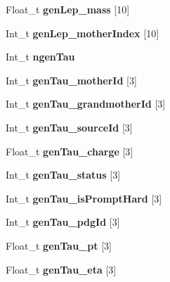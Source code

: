 \begin{DoxyCompactItemize}
Float\+\_\+t {\bfseries gen\+Lep\+\_\+mass} \mbox{[}10\mbox{]}
\item 
\hypertarget{classMiniTree_a01d35a8ecfa9de58be1a0b0c47d22b92}{}\label{classMiniTree_a01d35a8ecfa9de58be1a0b0c47d22b92} 
Int\+\_\+t {\bfseries gen\+Lep\+\_\+mother\+Index} \mbox{[}10\mbox{]}
\item 
\hypertarget{classMiniTree_ab884fe7256b0ea4e2cf3d645eb722571}{}\label{classMiniTree_ab884fe7256b0ea4e2cf3d645eb722571} 
Int\+\_\+t {\bfseries ngen\+Tau}
\item 
\hypertarget{classMiniTree_ae624f2f7687d7b5708c8483f9ba8621f}{}\label{classMiniTree_ae624f2f7687d7b5708c8483f9ba8621f} 
Int\+\_\+t {\bfseries gen\+Tau\+\_\+mother\+Id} \mbox{[}3\mbox{]}
\item 
\hypertarget{classMiniTree_af1a69b0a5745dfa62410b24331b5b0cf}{}\label{classMiniTree_af1a69b0a5745dfa62410b24331b5b0cf} 
Int\+\_\+t {\bfseries gen\+Tau\+\_\+grandmother\+Id} \mbox{[}3\mbox{]}
\item 
\hypertarget{classMiniTree_af50be52be6f2c227b98edfdd798f6ea0}{}\label{classMiniTree_af50be52be6f2c227b98edfdd798f6ea0} 
Int\+\_\+t {\bfseries gen\+Tau\+\_\+source\+Id} \mbox{[}3\mbox{]}
\item 
\hypertarget{classMiniTree_a94d917bf8c71b594802d6f8d9d6b7975}{}\label{classMiniTree_a94d917bf8c71b594802d6f8d9d6b7975} 
Float\+\_\+t {\bfseries gen\+Tau\+\_\+charge} \mbox{[}3\mbox{]}
\item 
\hypertarget{classMiniTree_a2dc647d09b8fb285c789ef62c91e6342}{}\label{classMiniTree_a2dc647d09b8fb285c789ef62c91e6342} 
Int\+\_\+t {\bfseries gen\+Tau\+\_\+status} \mbox{[}3\mbox{]}
\item 
\hypertarget{classMiniTree_aa17eaa39cd1d06c38138fe9fc2af29b3}{}\label{classMiniTree_aa17eaa39cd1d06c38138fe9fc2af29b3} 
Int\+\_\+t {\bfseries gen\+Tau\+\_\+is\+Prompt\+Hard} \mbox{[}3\mbox{]}
\item 
\hypertarget{classMiniTree_a84e0e07a91ea6692020e001594b357fe}{}\label{classMiniTree_a84e0e07a91ea6692020e001594b357fe} 
Int\+\_\+t {\bfseries gen\+Tau\+\_\+pdg\+Id} \mbox{[}3\mbox{]}
\item 
\hypertarget{classMiniTree_a4c131fda5ecd3ecb766535077b9d6472}{}\label{classMiniTree_a4c131fda5ecd3ecb766535077b9d6472} 
Float\+\_\+t {\bfseries gen\+Tau\+\_\+pt} \mbox{[}3\mbox{]}
\item 
\hypertarget{classMiniTree_a2b1ea4e1bdb2cd0935c2ae326e6f8f92}{}\label{classMiniTree_a2b1ea4e1bdb2cd0935c2ae326e6f8f92} 
Float\+\_\+t {\bfseries gen\+Tau\+\_\+eta} \mbox{[}3\mbox{]}
\item 

\end{DoxyCompactItemize}
